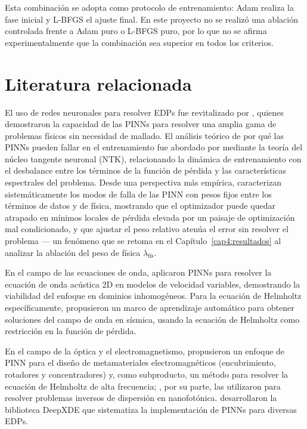 Esta combinación se adopta como protocolo de entrenamiento: Adam realiza la
fase inicial y L-BFGS el ajuste final. En este proyecto no se realizó una
ablación controlada frente a Adam puro o L-BFGS puro, por lo que no se afirma
experimentalmente que la combinación sea superior en todos los criterios.

\section{Literatura relacionada}

El uso de redes neuronales para resolver EDPs fue revitalizado por
\textcite{raissi2019physics}, quienes demostraron la capacidad de las PINNs
para resolver una amplia gama de problemas físicos sin necesidad de mallado.
El análisis teórico de por qué las PINNs pueden fallar en el entrenamiento fue
abordado por \textcite{wang2022ntk} mediante la teoría del núcleo tangente
neuronal (NTK), relacionando la dinámica de entrenamiento con el desbalance
entre los términos de la función de pérdida y las características espectrales
del problema. Desde una perspectiva más empírica,
\textcite{krishnapriyan2021characterizing} caracterizan sistemáticamente los
modos de falla de las PINN con pesos fijos entre los términos de datos y de
física, mostrando que el optimizador puede quedar atrapado en mínimos locales
de pérdida elevada por un paisaje de optimización mal condicionado, y que
ajustar el peso relativo atenúa el error sin resolver el problema — un fenómeno
que
se retoma en el Capítulo~\ref{cap4:resultados} al analizar la ablación del peso
de física $\lambda_\text{fís}$.

En el campo de las ecuaciones de onda, \textcite{moseley2020wave} aplicaron
PINNs para resolver la ecuación de onda acústica 2D en modelos de velocidad
variables, demostrando la viabilidad del enfoque en dominios inhomogéneos.
Para la ecuación de Helmholtz específicamente, \textcite{alkhalifah2021wavefield}
propusieron un marco de aprendizaje automático para obtener soluciones del campo
de onda en sísmica, usando la ecuación de Helmholtz como restricción en la
función de pérdida.

En el campo de la óptica y el electromagnetismo, \textcite{fang2020physics}
propusieron un enfoque de PINN para el diseño de metamateriales
electromagnéticos (encubrimiento, rotadores y concentradores) y, como
subproducto, un método para resolver la ecuación de Helmholtz de alta
frecuencia; \textcite{chen2020physics}, por su parte, las utilizaron para
resolver problemas inversos de dispersión en nanofotónica. \textcite{lu2021deepxde} desarrollaron la
biblioteca DeepXDE que sistematiza la implementación de PINNs para diversas EDPs.

